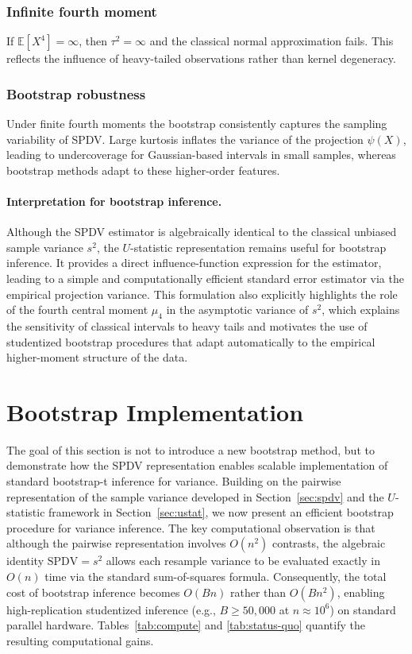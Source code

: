 \documentclass[12pt,a4paper]{article}
\begin{document}
\subsubsection{Infinite fourth moment}
If $\mathbb{E}[X^4]=\infty$, then $\tau^2=\infty$ and the classical normal approximation fails. This reflects the influence of heavy-tailed observations rather than kernel degeneracy.

\subsubsection{Bootstrap robustness}
Under finite fourth moments the bootstrap consistently captures the sampling variability of SPDV. Large kurtosis inflates the variance of the projection $\psi(X)$, leading to undercoverage for Gaussian-based intervals in small samples, whereas bootstrap methods adapt to these higher-order features.

\paragraph{Interpretation for bootstrap inference.}
Although the SPDV estimator is algebraically identical to the classical unbiased sample variance $s^2$, the $U$-statistic representation remains useful for bootstrap inference. It provides a direct influence-function expression for the estimator, leading to a simple and computationally efficient standard error estimator via the empirical projection variance. This formulation also explicitly highlights the role of the fourth central moment $\mu_4$ in the asymptotic variance of $s^2$, which explains the sensitivity of classical intervals to heavy tails and motivates the use of studentized bootstrap procedures that adapt automatically to the empirical higher-moment structure of the data.

\section{Bootstrap Implementation}\label{sec:bootstrap-impl}

The goal of this section is not to introduce a new bootstrap method,
but to demonstrate how the SPDV representation enables scalable
implementation of standard bootstrap-t inference for variance.
Building on the pairwise representation of the sample variance developed in
Section~\ref{sec:spdv} and the $U$-statistic framework in
Section~\ref{sec:ustat}, we now present an efficient bootstrap procedure for
variance inference. The key computational observation is that although the
pairwise representation involves $O(n^2)$ contrasts, the algebraic identity
$\text{SPDV}=s^2$ allows each resample variance to be evaluated exactly in
$O(n)$ time via the standard sum-of-squares formula. Consequently, the total
cost of bootstrap inference becomes $O(Bn)$ rather than $O(Bn^2)$, enabling
high-replication studentized inference (e.g., $B \ge 50{,}000$ at
$n \approx 10^6$) on standard parallel hardware. Tables~\ref{tab:compute} and
\ref{tab:status-quo} quantify the resulting computational gains.
\end{document}
